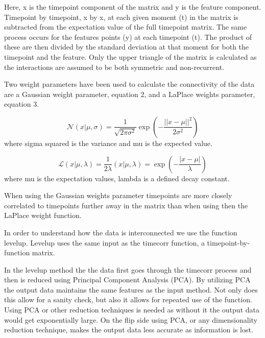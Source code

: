 Here, x is the timepoint component of the matrix and y is the feature component. Timepoint by timepoint, x by x, at each given moment (t) in the matrix is subtracted from the expectation value of the full timepoint matrix. The same process occurs for the features points (y) at each timepoint (t). The product of these are then divided by the standard deviation at that moment for both the timepoint and the feature. Only the upper triangle of the matrix is calculated as the interactions are assumed to be both symmetric and non-recurrent. 

Two weight parameters have been used to calculate the connectivity of the data are a Gaussian weight parameter, equation 2, and a LaPlace weights parameter, equation 3. 

\begin{equation}
\mathcal{N}\left( x | \mu, \sigma \right) = \frac{1}{\sqrt{2\pi\sigma^2}}\exp\left(-\frac{|| x - \mu ||^2}{2\sigma^2}\right)
\end{equation}
where sigma squared is the variance and mu is the expected value. 

\begin{equation}
\mathcal{L}\left( x | \mu, \lambda \right) = \frac{1}{2 \lambda}\left( x | \mu, \lambda \right) = \exp\left(-\frac{|x - \mu|}{\lambda}\right)
\end{equation}
where mu is the expectation values, lambda is a defined decay constant. 


When using the Gaussian weights parameter timepoints are more closely correlated to timepoints further away in the matrix than when using then the LaPlace weight function.


In order to understand how the data is interconnected we use the function levelup. Levelup uses the same input as the timecorr function, a timepoint-by-function matrix. 


In the levelup method the the data first goes through the timecorr process and then is reduced using Principal Component Analysis (PCA). By utilizing PCA the output data maintains the same features as the input method. Not only does this allow for a sanity check, but also it allows for repeated use of the function. Using PCA or other reduction techniques is needed as without it the output data would get exponentially large. On the flip side using PCA, or any dimensionality reduction technique, makes the output data less accurate as information is lost. 


